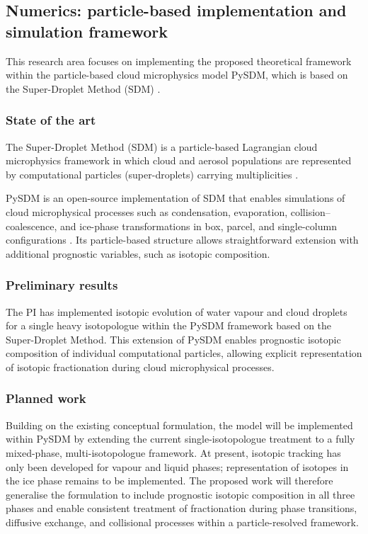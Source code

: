 \documentclass[12pt]{article}
\begin{document}
\subsection{Numerics: particle-based implementation
    and simulation framework}\label{A2}

This research area focuses on implementing the proposed theoretical
framework within the particle-based cloud microphysics model PySDM,
which is based on the Super-Droplet Method (SDM) \parencite{2009_Shima_EtAl}.

\subsubsection*{State of the art}
The Super-Droplet Method (SDM) is a particle-based Lagrangian cloud microphysics framework 
in which cloud and aerosol populations are represented by computational particles 
(super-droplets) carrying multiplicities \parencite{2009_Shima_EtAl}.

PySDM is an open-source implementation of SDM that enables simulations of cloud
microphysical processes such as condensation, evaporation, collision–coalescence,
and ice-phase transformations in box, parcel, and single-column configurations
\parencite{2022_Bartman_EtAl, 2023_DeJong_EtAl}.
Its particle-based structure allows straightforward extension with additional prognostic
variables, such as isotopic composition.

\subsubsection*{Preliminary results}

The PI has implemented isotopic evolution of water vapour
and cloud droplets for a single heavy isotopologue 
within the PySDM framework based on the Super-Droplet Method.
This extension of PySDM enables prognostic isotopic composition of
individual computational particles,
allowing explicit representation of isotopic fractionation during
cloud microphysical processes.

\subsubsection*{Planned work}
Building on the existing conceptual formulation,
the model will be implemented within PySDM by extending the current single-isotopologue
treatment to a fully mixed-phase, multi-isotopologue framework.
At present, isotopic tracking has only been developed for vapour and liquid phases;
representation of isotopes in the ice phase remains to be implemented.
The proposed work will therefore generalise the formulation to include
prognostic isotopic composition in all three phases and enable consistent
treatment of fractionation during phase transitions, diffusive exchange,
and collisional processes within a particle-resolved framework.
\end{document}
